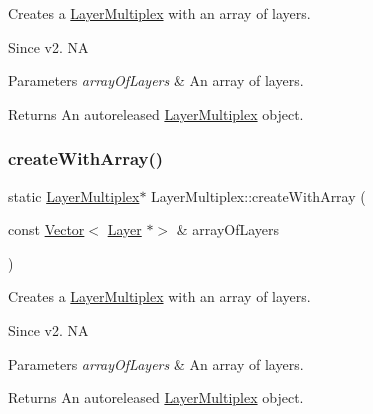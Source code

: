 Creates a \hyperlink{classLayerMultiplex}{Layer\+Multiplex} with an array of layers. \begin{DoxySince}{Since}
v2.  NA
\end{DoxySince}

\begin{DoxyParams}{Parameters}
{\em array\+Of\+Layers} & An array of layers. \\
\hline
\end{DoxyParams}
\begin{DoxyReturn}{Returns}
An autoreleased \hyperlink{classLayerMultiplex}{Layer\+Multiplex} object. 
\end{DoxyReturn}
\mbox{\label{classLayerMultiplex_a399fab9defd87847b2562d0b24c59971}} 
\subsubsection{\texorpdfstring{create\+With\+Array()}{createWithArray()}\hspace{0.1cm}{\footnotesize\ttfamily [2/2]}}
{\footnotesize\ttfamily static \hyperlink{classLayerMultiplex}{Layer\+Multiplex}$\ast$ Layer\+Multiplex\+::create\+With\+Array (\begin{DoxyParamCaption}\item[{const \hyperlink{classVector}{Vector}$<$ \hyperlink{classLayer}{Layer} $\ast$$>$ \&}]{array\+Of\+Layers }\end{DoxyParamCaption})\hspace{0.3cm}{\ttfamily [static]}}

Creates a \hyperlink{classLayerMultiplex}{Layer\+Multiplex} with an array of layers. \begin{DoxySince}{Since}
v2.  NA
\end{DoxySince}

\begin{DoxyParams}{Parameters}
{\em array\+Of\+Layers} & An array of layers. \\
\hline
\end{DoxyParams}
\begin{DoxyReturn}{Returns}
An autoreleased \hyperlink{classLayerMultiplex}{Layer\+Multiplex} object. 
\end{DoxyReturn}
\mbox{\label{classLayerMultiplex_a0e886e3db1fbdf870cc940093b332d98}} 
